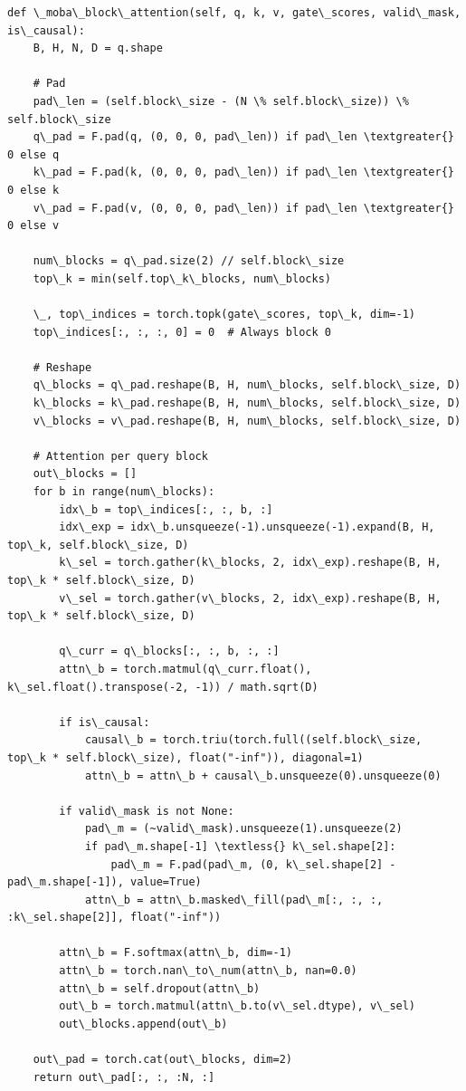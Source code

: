 \begin{lstlisting}
def \_moba\_block\_attention(self, q, k, v, gate\_scores, valid\_mask, is\_causal):
    B, H, N, D = q.shape
    
    # Pad
    pad\_len = (self.block\_size - (N \% self.block\_size)) \% self.block\_size
    q\_pad = F.pad(q, (0, 0, 0, pad\_len)) if pad\_len \textgreater{} 0 else q
    k\_pad = F.pad(k, (0, 0, 0, pad\_len)) if pad\_len \textgreater{} 0 else k
    v\_pad = F.pad(v, (0, 0, 0, pad\_len)) if pad\_len \textgreater{} 0 else v
    
    num\_blocks = q\_pad.size(2) // self.block\_size
    top\_k = min(self.top\_k\_blocks, num\_blocks)
    
    \_, top\_indices = torch.topk(gate\_scores, top\_k, dim=-1)
    top\_indices[:, :, :, 0] = 0  # Always block 0
    
    # Reshape
    q\_blocks = q\_pad.reshape(B, H, num\_blocks, self.block\_size, D)
    k\_blocks = k\_pad.reshape(B, H, num\_blocks, self.block\_size, D)
    v\_blocks = v\_pad.reshape(B, H, num\_blocks, self.block\_size, D)
    
    # Attention per query block
    out\_blocks = []
    for b in range(num\_blocks):
        idx\_b = top\_indices[:, :, b, :]
        idx\_exp = idx\_b.unsqueeze(-1).unsqueeze(-1).expand(B, H, top\_k, self.block\_size, D)
        k\_sel = torch.gather(k\_blocks, 2, idx\_exp).reshape(B, H, top\_k * self.block\_size, D)
        v\_sel = torch.gather(v\_blocks, 2, idx\_exp).reshape(B, H, top\_k * self.block\_size, D)
        
        q\_curr = q\_blocks[:, :, b, :, :]
        attn\_b = torch.matmul(q\_curr.float(), k\_sel.float().transpose(-2, -1)) / math.sqrt(D)
        
        if is\_causal:
            causal\_b = torch.triu(torch.full((self.block\_size, top\_k * self.block\_size), float("-inf")), diagonal=1)
            attn\_b = attn\_b + causal\_b.unsqueeze(0).unsqueeze(0)
        
        if valid\_mask is not None:
            pad\_m = (~valid\_mask).unsqueeze(1).unsqueeze(2)
            if pad\_m.shape[-1] \textless{} k\_sel.shape[2]:
                pad\_m = F.pad(pad\_m, (0, k\_sel.shape[2] - pad\_m.shape[-1]), value=True)
            attn\_b = attn\_b.masked\_fill(pad\_m[:, :, :, :k\_sel.shape[2]], float("-inf"))
        
        attn\_b = F.softmax(attn\_b, dim=-1)
        attn\_b = torch.nan\_to\_num(attn\_b, nan=0.0)
        attn\_b = self.dropout(attn\_b)
        out\_b = torch.matmul(attn\_b.to(v\_sel.dtype), v\_sel)
        out\_blocks.append(out\_b)
    
    out\_pad = torch.cat(out\_blocks, dim=2)
    return out\_pad[:, :, :N, :]
\end{lstlisting}

